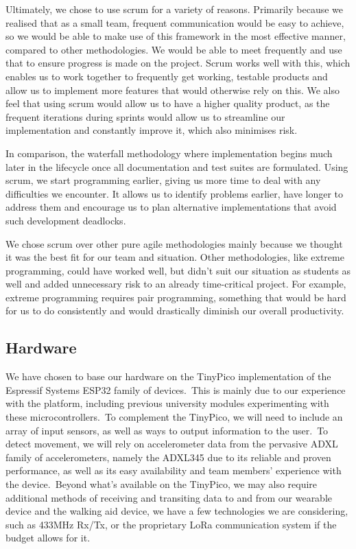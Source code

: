            Ultimately, we chose to use scrum for a variety of reasons. Primarily because we realised that as a small
            team, frequent communication would be easy to achieve, so we would be able to make use of this framework in
            the most effective manner, compared to other methodologies. We would be able to meet frequently and use that
            to ensure progress is made on the project. Scrum works well with this, which enables us to work together to
            frequently get working, testable products and allow us to implement more features that would otherwise rely
            on this. We also feel that using scrum would allow us to have a higher quality product, as the frequent
            iterations during sprints would allow us to streamline our implementation and constantly improve it, which
            also minimises risk.

            In comparison, the waterfall methodology where implementation begins much later in the lifecycle once all
            documentation and test suites are formulated. Using scrum, we start programming earlier, giving us more time
            to deal with any difficulties we encounter. It allows us to identify problems earlier, have longer to
            address them and encourage us to plan alternative implementations that avoid such development deadlocks.

            We chose scrum over other pure agile methodologies mainly because we thought it was the best fit for our
            team and situation. Other methodologies, like extreme programming, could have worked well, but didn’t suit
            our situation as students as well and added unnecessary risk to an already time-critical project. For
            example, extreme programming requires pair programming, something that would be hard for us to do
            consistently and would drastically diminish our overall productivity.

        \subsection{Hardware}
            We have chosen to base our hardware on the TinyPico implementation of the Espressif Systems ESP32 family of
            devices.\ This is mainly due to our experience with the platform, including previous university modules
            experimenting with these microcontrollers.\ To complement the TinyPico, we will need to include an array of
            input sensors, as well as ways to output information to the user.\ To detect movement, we will rely
            on accelerometer data from the pervasive ADXL family of accelerometers, namely the ADXL345 due to its
            reliable and proven performance, as well as its easy availability and team members' experience with the
            device.\ Beyond what's available on the TinyPico, we may also require additional methods of receiving and
            transiting data to and from our wearable device and the walking aid device, we have a few technologies we
            are considering, such as 433MHz Rx/Tx, or the proprietary LoRa communication system if the budget allows for
            it.

